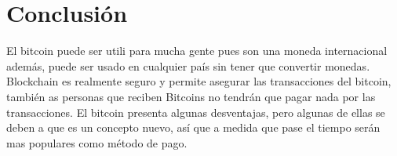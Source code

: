 \documentclass[10pt,journal,compsoc]{IEEEtran}
\begin{document}
%






\section{Conclusión}

El bitcoin puede ser utili para mucha gente pues son una moneda internacional además, puede ser usado en cualquier país sin tener que convertir monedas. Blockchain es realmente seguro y permite asegurar las transacciones del bitcoin, también as personas que reciben Bitcoins no tendrán que pagar nada por las transacciones. El bitcoin presenta  algunas desventajas, pero algunas de ellas se deben a que es un concepto nuevo, así que a medida que pase el tiempo serán mas populares como método de pago.
\end{document}
